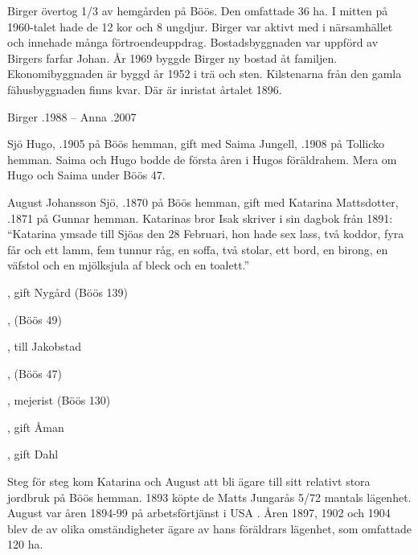 Birger övertog 1/3 av hemgården på Böös. Den omfattade 36 ha. I mitten på 1960-talet hade de 12 kor och 8 ungdjur. Birger var aktivt med i närsamhället och innehade många förtroendeuppdrag. Bostadsbyggnaden var uppförd av Birgers farfar Johan. År 1969 byggde Birger ny bostad åt familjen. Ekonomibyggnaden är byggd år 1952 i trä och sten. Kilstenarna från den gamla fähusbyggnaden finns kvar. Där är inristat årtalet 1896.

Birger .1988  --  Anna .2007

Sjö Hugo, .1905 på Böös hemman, gift med Saima Jungell, .1908 på Tollicko hemman. Saima och Hugo bodde de första åren i Hugos föräldrahem. Mera om Hugo och Saima under Böös 47.


August Johansson Sjö, .1870 på Böös hemman, gift med Katarina Mattsdotter, .1871 på Gunnar hemman. Katarinas bror Isak skriver i sin dagbok från 1891: ``Katarina ymsade till Sjöas den 28 Februari, hon hade sex lass, två koddor, fyra får och ett lamm, fem tunnur råg, en soffa, två stolar, ett bord, en birong, en väfstol och en mjölksjula af bleck och en toalett.''
\begin{jhchildren}
  \item {}, gift Nygård (Böös 139)
  \item {}, (Böös 49)
  \item {}, till Jakobstad
  \item {}
  \item {}, (Böös 47)
  \item {}
  \item {}
  \item {}, mejerist (Böös 130)
  \item {}, gift Åman
  \item {}, gift Dahl
  \item {}
\end{jhchildren}
Steg för steg kom Katarina och August att bli ägare till sitt relativt stora jordbruk på Böös hemman. 1893 köpte de Matts Jungarås 5/72 mantals lägenhet. August var åren 1894-99 på arbetsförtjänst i USA . Åren 1897, 1902 och 1904 blev de av olika omständigheter ägare av hans föräldrars lägenhet, som omfattade 120 ha.

